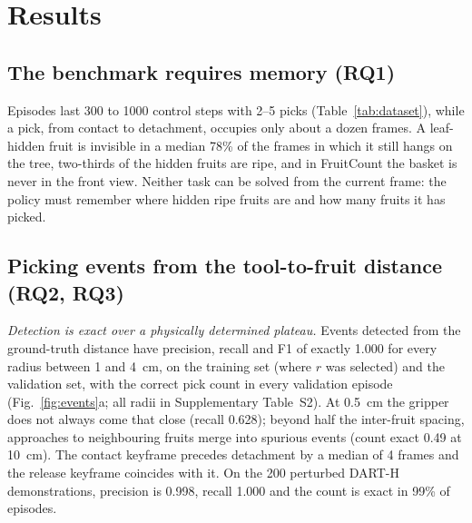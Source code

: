 \section{Results}
\label{sec:results}

\subsection{The benchmark requires memory (RQ1)}
\label{sec:res_bench}
Episodes last 300 to 1000 control steps with 2--5 picks (Table~\ref{tab:dataset}), while a pick, from contact to detachment, occupies only about a dozen frames. A leaf-hidden fruit is invisible in a median 78\% of the frames in which it still hangs on the tree, two-thirds of the hidden fruits are ripe, and in FruitCount the basket is never in the front view. Neither task can be solved from the current frame: the policy must remember where hidden ripe fruits are and how many fruits it has picked.

\subsection{Picking events from the tool-to-fruit distance (RQ2, RQ3)}
\label{sec:res_events}
\label{sec:res_robust}
\emph{Detection is exact over a physically determined plateau.} Events detected from the ground-truth distance have precision, recall and F1 of exactly 1.000 for every radius between 1 and 4~cm, on the training set (where $r$ was selected) and the validation set, with the correct pick count in every validation episode (Fig.~\ref{fig:events}a; all radii in Supplementary Table~S2). At 0.5~cm the gripper does not always come that close (recall 0.628); beyond half the inter-fruit spacing, approaches to neighbouring fruits merge into spurious events (count exact 0.49 at 10~cm). The contact keyframe precedes detachment by a median of 4 frames and the release keyframe coincides with it. On the 200 perturbed DART-H demonstrations, precision is 0.998, recall 1.000 and the count is exact in 99\% of episodes.

